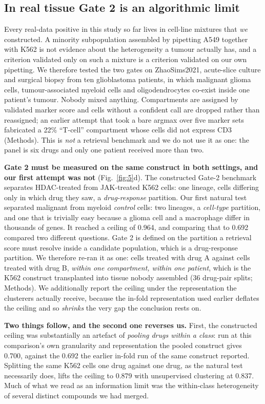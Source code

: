 \documentclass[11pt,letterpaper]{article}
\begin{document}
\subsection*{In real tissue Gate 2 is an algorithmic limit}

Every real-data positive in this study so far lives in cell-line mixtures that \emph{we}
constructed. A minority subpopulation assembled by pipetting A549 together with K562 is not
evidence about the heterogeneity a tumour actually has, and a criterion validated only on such a
mixture is a criterion validated on our own pipetting. We therefore tested the two gates on
ZhaoSims2021, acute-slice culture and surgical biopsy from ten glioblastoma patients, in
which malignant glioma cells, tumour-associated myeloid cells and oligodendrocytes co-exist inside
one patient's tumour. Nobody mixed anything. Compartments are assigned by validated marker score
and cells without a confident call are dropped rather than reassigned; an earlier attempt that took
a bare argmax over five marker sets fabricated a 22\% ``T-cell'' compartment whose cells did not
express CD3 (Methods). This is \emph{not} a retrieval benchmark and we do not use it as one: the
panel is six drugs and only one patient received more than two.

\textbf{Gate 2 must be measured on the same construct in both settings, and our first attempt was
not} (Fig.~\ref{fig:5}d). The constructed Gate-2 benchmark separates HDAC-treated from JAK-treated
K562 cells: one lineage, cells differing only in which drug they saw, a \emph{drug-response}
partition. Our first natural test separated malignant from myeloid \emph{control} cells: two
lineages, a \emph{cell-type} partition, and one that is trivially easy because a glioma cell and a
macrophage differ in thousands of genes. It reached a ceiling of 0.964, and comparing that to
0.692 compared two different questions. Gate 2 is defined on the partition a retrieval score must
resolve inside a candidate population, which is a drug-response partition. We therefore re-ran it
as one: cells treated with drug A against cells treated with drug B, \emph{within one compartment,
within one patient}, which is the K562 construct transplanted into tissue nobody assembled
(36 drug-pair splits; Methods). We additionally report the ceiling under the representation the
clusterers actually receive, because the in-fold representation used earlier deflates the ceiling
and so \emph{shrinks} the very gap the conclusion rests on.

\textbf{Two things follow, and the second one reverses us.} First, the constructed ceiling was
substantially an artefact of \emph{pooling drugs within a class}: run at this comparison's own
granularity and representation the pooled construct gives 0.700, against the 0.692 the earlier
in-fold run of the same construct reported. Splitting the same
K562 cells one drug against one drug, as the natural test necessarily does, lifts the ceiling to
0.879 with unsupervised clustering at 0.837. Much of what we read as an
information limit was the within-class heterogeneity of several distinct compounds we had merged.
\end{document}
